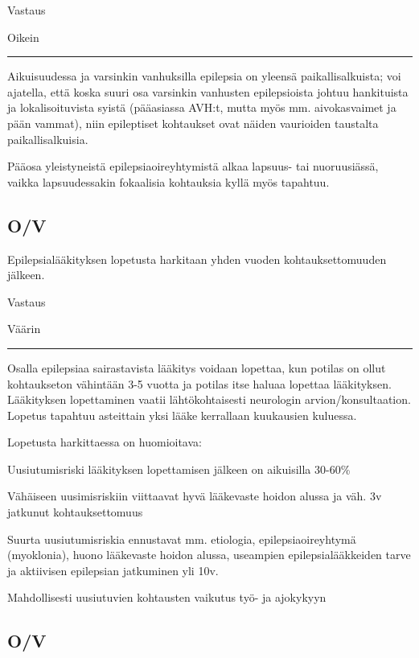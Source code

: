 \documentclass[
]{book}
\begin{document}
Vastaus

Oikein

\begin{center}\rule{0.5\linewidth}{0.5pt}\end{center}

Aikuisuudessa ja varsinkin vanhuksilla epilepsia on yleensä paikallisalkuista; voi ajatella, että koska suuri osa varsinkin vanhusten epilepsioista johtuu hankituista ja lokalisoituvista syistä (pääasiassa AVH:t, mutta myös mm. aivokasvaimet ja pään vammat), niin epileptiset kohtaukset ovat näiden vaurioiden taustalta paikallisalkuisia.

Pääosa yleistyneistä epilepsiaoireyhtymistä alkaa lapsuus- tai nuoruusiässä, vaikka lapsuudessakin fokaalisia kohtauksia kyllä myös tapahtuu.

\subsection{O/V}\label{ov-8}

Epilepsialääkityksen lopetusta harkitaan yhden vuoden kohtauksettomuuden jälkeen.

Vastaus

Väärin

\begin{center}\rule{0.5\linewidth}{0.5pt}\end{center}

Osalla epilepsiaa sairastavista lääkitys voidaan lopettaa, kun potilas on ollut kohtaukseton vähintään 3-5 vuotta ja potilas itse haluaa lopettaa lääkityksen. Lääkityksen lopettaminen vaatii lähtökohtaisesti neurologin arvion/konsultaation. Lopetus tapahtuu asteittain yksi lääke kerrallaan kuukausien kuluessa.

Lopetusta harkittaessa on huomioitava:

Uusiutumisriski lääkityksen lopettamisen jälkeen on aikuisilla 30-60\%

Vähäiseen uusimisriskiin viittaavat hyvä lääkevaste hoidon alussa ja väh. 3v jatkunut kohtauksettomuus

Suurta uusiutumisriskia ennustavat mm. etiologia, epilepsiaoireyhtymä (myoklonia), huono lääkevaste hoidon alussa, useampien epilepsialääkkeiden tarve ja aktiivisen epilepsian jatkuminen yli 10v.

Mahdollisesti uusiutuvien kohtausten vaikutus työ- ja ajokykyyn

\subsection{O/V}\label{ov-9}
\end{document}
